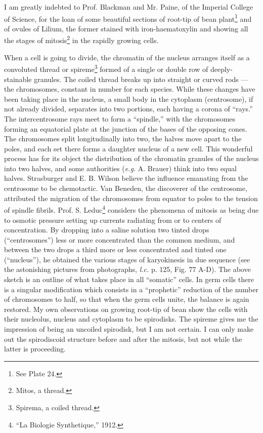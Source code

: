 \documentclass[a4paper, 12pt, oneside]{article}
\begin{document}
I am greatly indebted to Prof. Blackman and Mr. Paine, of the Imperial College of Science, for the loan of some beautiful sections of root-tip of bean plant\footnote{See Plate 24.} and of ovules of Lilium, the former stained with iron-haematoxylin and showing all the stages of mitosis\footnote{Mitos, a thread.} in the rapidly growing cells.

When a cell is going to divide, the chromatin of the nucleus arranges itself as a convoluted thread or spireme\footnote{Spirema, a coiled thread.} formed of a single or double row of deeply-stainable granules. The coiled thread breaks up into straight or curved rods --- the chromosomes, constant in number for each species. While these changes have been taking place in the nucleus, a small body in the cytoplasm (centrosome), if not already divided, separates into two portions, each having a corona of ``rays.'' The intercentrosome rays meet to form a ``spindle,'' with the chromosomes forming an equatorial plate at the junction of the bases of the opposing cones. The chromosomes split longitudinally into two, the halves move apart to the poles, and each set there forms a daughter nucleus of a new cell. This wonderful process has for its object the distribution of the chromatin granules of the nucleus into two halves, and some authorities (\emph{e.g.} A. Brauer) think into two equal halves. Strasburger and E. B. Wilson believe the influence emanating from the centrosome to be chemotactic. Van Beneden, the discoverer of the centrosome, attributed the migration of the chromosomes from equator to poles to the tension of spindle fibrils. Prof. S. Leduc\footnote{``La Biologie Synthetique,'' 1912.} considers the phenomena of mitosis as being due to osmotic pressure setting up currents radiating from or to centers of concentration. By dropping into a saline solution two tinted drops (``centrosomes'') less or more concentrated than the common medium, and between the two drops a third more or less concentrated and tinted one (``nucleus''), he obtained the various stages of karyokinesis in due sequence (see the astonishing pictures from photographs, \emph{l.c.} p. 125, Fig. 77 A-D). The above sketch is an outline of what takes place in all ``somatic'' cells. In germ cells there is a singular modification which consists in a ``prophetic'' reduction of the number of chromosomes to half, so that when the germ cells unite, the balance is again restored. My own observations on growing root-tip of bean show the cells with their nucleolus, nucleus and cytoplasm to be spirodisks. The spireme gives me the impression of being an uncoiled spirodisk, but I am not certain. I can only make out the spirodiscoid structure before and after the mitosis, but not while the latter is proceeding.
\end{document}
